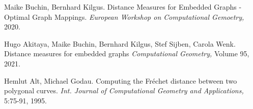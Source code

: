 \documentclass[a4paper, 12pt, twoside]{article}
\theoremstyle{Format1} %
\begin{document}
\begin{thebibliography}{3}
		Maike Buchin, Bernhard Kilgus. Distance Measures for Embedded Graphs - Optimal Graph Mappings.
		\textit{European Workshop on Computational Gemoetry,} 2020.

		Hugo Akitaya, Maike Buchin, Bernhard Kilgus, Stef Sijben, Carola Wenk. Distance measures for embedded graphs
		\textit{Computational Geometry,} Volume 95, 2021.

		Hemlut Alt, Michael Godau. Computing the Fréchet distance between two polygonal curves.
		\textit{Int. Journal of Computational Geometry and Applications,} 5:75-91, 1995.
\end{thebibliography}


\end{document}
